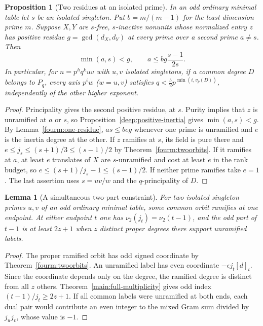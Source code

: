 \documentclass[11pt,a4paper]{article}
\numberwithin{equation}{section}
\newtheorem{proposition}[theorem]{Proposition}
\newtheorem{lemma}[theorem]{Lemma}
\theoremstyle{remark}
\begin{document}
\begin{proposition}[Two residues at an isolated prime]\label{fam:M:9.3}\label{prop:singleton-two-residues}
In an odd ordinary minimal table let $s$ be an isolated singleton.
Put $b=m/(m-1)$ for the least dimension prime $m$. Suppose $X,Y$ are $s$-free, $s$-inactive
nonunits whose normalized entry $z$ has positive residue
$g=\gcd(d_X,d_Y)$ at every prime over a second prime $a\ne s$.
Then
\[
                         \min(a,s)<g,\qquad a\le bg\frac{s-1}{2s}.
\]
In particular, for $n=p^hq^kuv$ with $u,v$ isolated singletons,
if a common degree $D$ belongs to $P_q$, every axis
$p^i w$ ($w=u,v$) satisfies $q<\tfrac b2 p^{\min(i,v_p(D))}$,
independently of the other higher exponent.
\end{proposition}
\begin{proof}
Principality gives the second positive residue, at $s$. Purity implies
that $z$ is unramified at $a$ or $s$, so Proposition~\ref{deep:positive-inertia}
gives $\min(a,s)<g$. By
Lemma~\ref{fourm:one-residue}, $as\le beg$ whenever one prime is
unramified and $e$ is the inertia degree at the other.
If $z$ ramifies at $s$, its field is pure there and
$e\le j_s\le(s+1)/3\le(s-1)/2$ by Theorem~\ref{fourm:twoorbits}.
If it ramifies at $a$, at least $e$ translates of $X$ are
$s$-unramified and cost at least $e$ in the rank budget, so
$e\le(s+1)/j_s-1\le(s-1)/2$. If neither prime ramifies take $e=1$.
The last assertion uses $s=uv/w$ and the $q$-principality of $D$.

\end{proof}

\begin{lemma}[A simultaneous two-part constraint]\label{fam:M:9.4}
\label{r6:twopart}
For two isolated singleton primes $u,v$ of an odd ordinary minimal table,
some common orbit ramifies at one endpoint. At either endpoint $t$ one has
$\nu_2(j_t)=\nu_2(t-1)$, and the odd part of $t-1$ is at least $2z+1$
when $z$ distinct proper degrees there support unramified labels.
\end{lemma}
\begin{proof}
The proper ramified orbit has odd signed coordinate by
Theorem~\ref{fourm:twoorbits}. An unramified label has even coordinate
$-\epsilon j_t[d]_t$. Since the coordinate depends only on the degree,
the ramified degree is distinct from all $z$ others.
Theorem~\ref{main:full-multiplicity} gives odd index $(t-1)/j_t\ge2z+1$.
If all common labels were unramified at both ends, each dual pair would
contribute an even integer to the mixed Gram sum divided by $j_u j_v$,
whose value is $-1$.
\end{proof}
\end{document}
